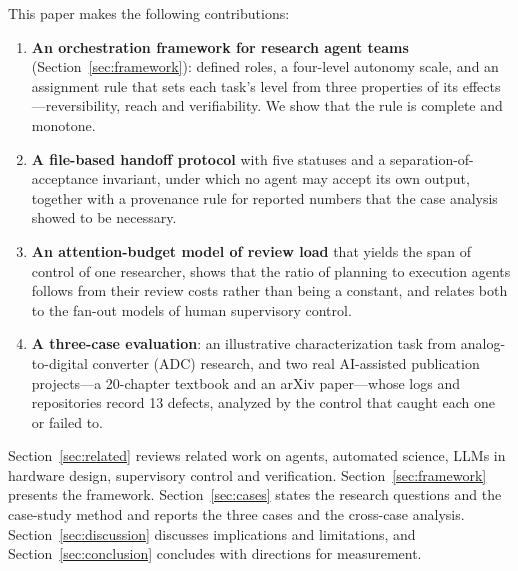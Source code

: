 This paper makes the following contributions:
\begin{enumerate}[leftmargin=*]
  \item \textbf{An orchestration framework for research agent teams}
        (Section~\ref{sec:framework}): defined roles, a four-level autonomy scale, and an
        assignment rule that sets each task's level from three properties of its
        effects---reversibility, reach and verifiability. We show that the rule is
        complete and monotone.
  \item \textbf{A file-based handoff protocol} with five statuses and a
        separation-of-acceptance invariant, under which no agent may accept its own
        output, together with a provenance rule for reported numbers that the case
        analysis showed to be necessary.
  \item \textbf{An attention-budget model of review load} that yields the span of control
        of one researcher, shows that the ratio of planning to execution agents follows
        from their review costs rather than being a constant, and relates both to the
        fan-out models of human supervisory control.
  \item \textbf{A three-case evaluation}: an illustrative characterization task from
        analog-to-digital converter (ADC) research, and two real AI-assisted publication
        projects---a 20-chapter textbook and an arXiv paper---whose logs and
        repositories record 13 defects, analyzed by the control that caught each one or
        failed to.
\end{enumerate}

Section~\ref{sec:related} reviews related work on agents, automated science, LLMs in
hardware design, supervisory control and verification. Section~\ref{sec:framework}
presents the framework. Section~\ref{sec:cases} states the research questions and the
case-study method and reports the three cases and the cross-case analysis.
Section~\ref{sec:discussion} discusses implications and limitations, and
Section~\ref{sec:conclusion} concludes with directions for measurement.
